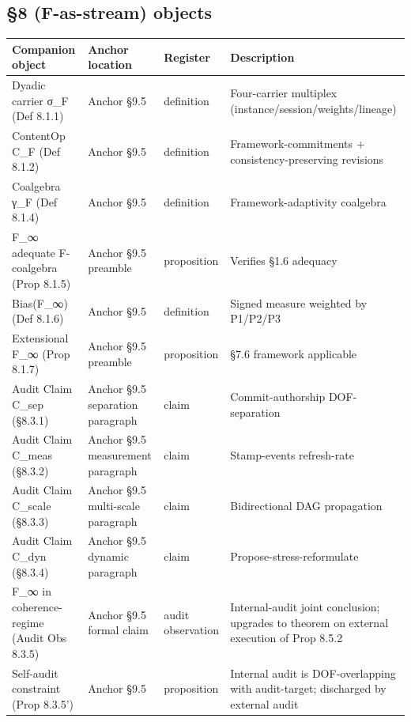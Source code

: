 \documentclass[11pt, openany]{book}
\begin{document}
\subsection{§8 (F-as-stream) objects}

\begingroup\setlength{\tabcolsep}{3pt}\renewcommand{\arraystretch}{1.15}\footnotesize
\begin{longtable}{p{0.97in} p{0.75in} p{0.57in} p{1.99in}}
\toprule
Companion object & Anchor location & Register & Description \\
\midrule
\endhead
\bottomrule
\endfoot
Dyadic carrier σ\_\allowbreak{}F (Def 8.1.1) & Anchor §9.5 & definition & Four-carrier multiplex (instance/\allowbreak session/\allowbreak weights/\allowbreak lineage) \\
\midrule
ContentOp C\_\allowbreak{}F (Def 8.1.2) & Anchor §9.5 & definition & Framework-commitments + consistency-preserving revisions \\
\midrule
Coalgebra γ\_\allowbreak{}F (Def 8.1.4) & Anchor §9.5 & definition & Framework-adaptivity coalgebra \\
\midrule
F\_\allowbreak{}∞ adequate F-coalgebra (Prop 8.1.5) & Anchor §9.5 preamble & proposition & Verifies §1.6 adequacy \\
\midrule
Bias(F\_\allowbreak{}∞) (Def 8.1.6) & Anchor §9.5 & definition & Signed measure weighted by P1/\allowbreak P2/\allowbreak P3 \\
\midrule
Extensional F\_\allowbreak{}∞ (Prop 8.1.7) & Anchor §9.5 preamble & proposition & §7.6 framework applicable \\
\midrule
Audit Claim C\_\allowbreak{}sep (§8.3.1) & Anchor §9.5 separation paragraph & claim & Commit-authorship DOF-separation \\
\midrule
Audit Claim C\_\allowbreak{}meas (§8.3.2) & Anchor §9.5 measurement paragraph & claim & Stamp-events refresh-rate \\
\midrule
Audit Claim C\_\allowbreak{}scale (§8.3.3) & Anchor §9.5 multi-scale paragraph & claim & Bidirectional DAG propagation \\
\midrule
Audit Claim C\_\allowbreak{}dyn (§8.3.4) & Anchor §9.5 dynamic paragraph & claim & Propose-stress-reformulate \\
\midrule
F\_\allowbreak{}∞ in coherence-regime (Audit Obs 8.3.5) & Anchor §9.5 formal claim & audit observation & Internal-audit joint conclusion; upgrades to theorem on external execution of Prop 8.5.2 \\
\midrule
Self-audit constraint (Prop 8.3.5') & Anchor §9.5 & proposition & Internal audit is DOF-overlapping with audit-target; discharged by external audit \\

\end{longtable}
\end{document}

